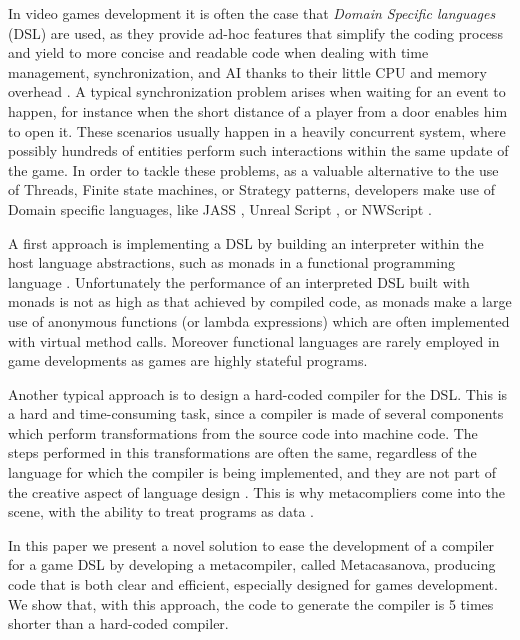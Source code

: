 In video games development it is often the case that  \textit{Domain
Specific languages} (DSL) are used, as they provide ad-hoc features
that simplify the coding process and yield to more concise and
readable code when dealing with  time management, synchronization, and
AI thanks to their little CPU and memory overhead
\cite{DSL_SURVEY_PAPER, GAME_SCRIPTING, CASANOVA2_PAPER} . A typical
synchronization problem arises when waiting for an event to happen, for instance when the short distance of a player from a door enables
him to open it. These scenarios usually happen in a heavily
concurrent system, where possibly hundreds of entities perform such
interactions within the same update of the game. In order to tackle
these problems, as a valuable alternative to the use of Threads,
Finite state machines, or Strategy patterns, developers make use of
Domain specific languages, like JASS \cite{JASS}, Unreal Script \cite{UNREAL_ENGINE},
or NWScript \cite{NW_SCRIPT}.

A first approach is implementing a DSL by
building an interpreter within the host language abstractions, such as
monads in a functional programming language \cite{DSL_MONAD_PAPER,
CASANOVA1_PAPER, SCRIPT_MONAD_PAPER}. Unfortunately the performance of
an interpreted DSL built with monads is not as high as that achieved
by compiled code, as monads make a large use of anonymous functions
(or lambda expressions) which are often implemented with virtual
method calls. Moreover functional languages are rarely employed in
game developments as games are highly stateful programs.

Another typical approach is to design a hard-coded compiler for the
DSL. This is a hard and time-consuming task, since a compiler is made
of several components which perform transformations from the source
code into machine code. The steps performed in this transformations
are often the same, regardless of the language for which the compiler
is being implemented, and they are not part of the creative aspect of
language design \cite{CWIC}. This is why metacompliers come into the
scene, with the ability to treat programs as data
\cite{GENERATIVE_PROGRAMMING_CZARNECKI}.

In this paper we present a novel solution to ease the development of a
compiler for a game DSL by developing a metacompiler, called Metacasanova, producing code
that is both clear and efficient, especially designed for games
development. We show that, with this approach, the code to generate the compiler is 5 times shorter than a hard-coded compiler.

